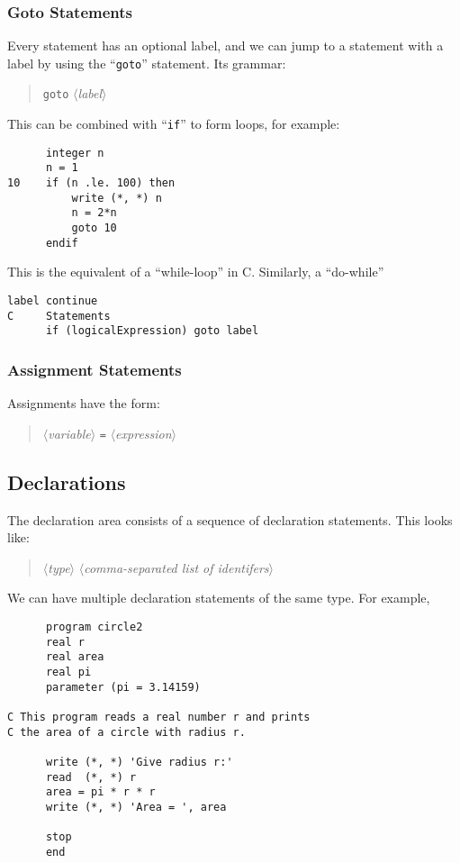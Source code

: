 \subsubsection{Goto Statements}
Every statement has an optional label, and we can jump to a statement
with a label by using the ``\texttt{goto}'' statement. Its grammar:
\begin{quote}
\texttt{goto} $\langle$\textit{label\/}$\rangle$
\end{quote}
This can be combined with ``\texttt{if}'' to form loops, for example:
\begin{lstlisting}
      integer n
      n = 1
10    if (n .le. 100) then
          write (*, *) n
          n = 2*n
          goto 10
      endif
\end{lstlisting}
This is the equivalent of a ``while-loop'' in C. Similarly, a ``do-while''
\begin{lstlisting}
label continue
C     Statements
      if (logicalExpression) goto label
\end{lstlisting}

\subsubsection{Assignment Statements}
Assignments have the form:
\begin{quote}
$\langle$\textit{variable\/}$\rangle$ \texttt{=} $\langle$\textit{expression\/}$\rangle$
\end{quote}

\subsection{Declarations}
The declaration area consists of a sequence of declaration
statements. This looks like:
\begin{quote}
$\langle$\textit{type\/}$\rangle$ $\langle$\textit{comma-separated list of identifers\/}$\rangle$
\end{quote}
We can have multiple declaration statements of the same type. For
example,
\begin{lstlisting}
      program circle2
      real r
      real area
      real pi
      parameter (pi = 3.14159)

C This program reads a real number r and prints
C the area of a circle with radius r.

      write (*, *) 'Give radius r:'
      read  (*, *) r
      area = pi * r * r
      write (*, *) 'Area = ', area

      stop
      end
\end{lstlisting}
